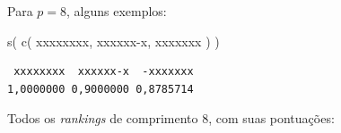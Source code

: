 \documentclass[
  letterpaper,
  DIV=11,
  numbers=noendperiod]{scrreprt}
\newenvironment{Shaded}{\begin{snugshade}}{\end{snugshade}}
\newcommand{\FunctionTok}[1]{\textcolor[rgb]{0.28,0.35,0.67}{#1}}
\newcommand{\NormalTok}[1]{\textcolor[rgb]{0.00,0.23,0.31}{#1}}
\newcommand{\StringTok}[1]{\textcolor[rgb]{0.13,0.47,0.30}{#1}}
\begin{document}
Para $p = 8$, alguns exemplos:

\begin{Shaded}
\begin{Highlighting}[]
\FunctionTok{s}\NormalTok{(}
  \FunctionTok{c}\NormalTok{(}
    \StringTok{\textquotesingle{}xxxxxxxx\textquotesingle{}}\NormalTok{,}
    \StringTok{\textquotesingle{}xxxxxx{-}x\textquotesingle{}}\NormalTok{,}
    \StringTok{\textquotesingle{}{-}xxxxxxx\textquotesingle{}}
\NormalTok{  )}
\NormalTok{)}
\end{Highlighting}
\end{Shaded}

\begin{verbatim}
 xxxxxxxx  xxxxxx-x  -xxxxxxx 
1,0000000 0,9000000 0,8785714 
\end{verbatim}

Todos os \emph{rankings} de comprimento $8$, com suas pontuações:
\end{document}
